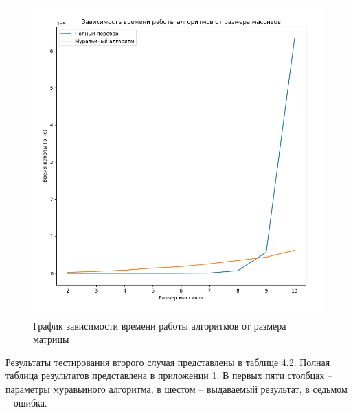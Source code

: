 \FloatBarrier
\begin{figure}[h]
	\begin{center}
		\includegraphics[width=\linewidth]{inc/graph.png}
	\end{center}
	\caption{График зависимости времени работы алгоритмов от размера матрицы}
\end{figure}
\FloatBarrier


Результаты тестирования второго случая представлены в таблице 4.2.
Полная таблица результатов представлена в приложении 1.
В первых пяти столбцах -- параметры муравьиного алгоритма, в шестом -- выдаваемый результат, в седьмом -- ошибка.

